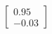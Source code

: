 \documentclass[preview]{standalone}
\begin{document}
\begin{align*}
\begin{bmatrix} 0.95 \\ -0.03 \end{bmatrix}
\end{align*}
\end{document}
